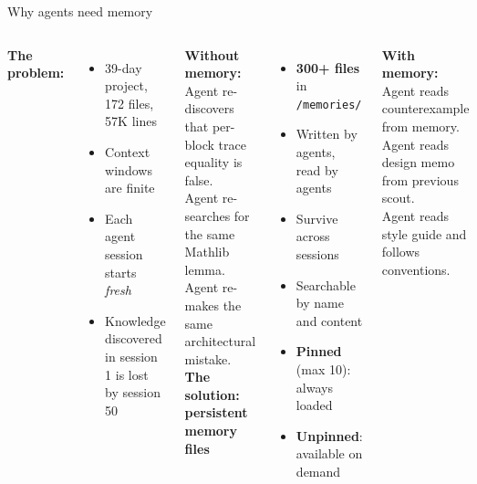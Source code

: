 \documentclass[aspectratio=169,10pt]{beamer}
\begin{document}
\begin{frame}{Why agents need memory}
    \begin{columns}[T]
        \textbf{The problem:}
        \begin{itemize}
            \item 39-day project, 172 files, 57K lines
            \item Context windows are finite
            \item Each agent session starts \emph{fresh}
            \item Knowledge discovered in session 1 is lost by session 50
        \end{itemize}
        \vspace{0.5em}
        \textcolor{softred}{\textbf{Without memory:}}\\
        Agent re-discovers that per-block trace equality is false.\\
        Agent re-searches for the same Mathlib lemma.\\
        Agent re-makes the same architectural mistake.
        \textbf{The solution: persistent memory files}
        \begin{itemize}
            \item \textbf{300+ files} in \texttt{/memories/}
            \item Written by agents, read by agents
            \item Survive across sessions
            \item Searchable by name and content
            \item \textbf{Pinned} (max 10): always loaded
            \item \textbf{Unpinned}: available on demand
        \end{itemize}
        \vspace{0.5em}
        \textcolor{leangreen}{\textbf{With memory:}}\\
        Agent reads counterexample from memory.\\
        Agent reads design memo from previous scout.\\
        Agent reads style guide and follows conventions.
    \end{columns}
\end{frame}
\end{document}
